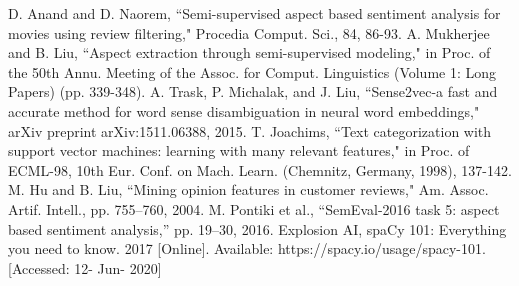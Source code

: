 \documentclass[a4paper,conference]{IEEEtran}
\begin{document}
\begin{thebibliography}{00}
 D. Anand and D. Naorem, ``Semi-supervised aspect based sentiment analysis for movies using review filtering," Procedia Comput. Sci., 84, 86-93.
 A. Mukherjee and B. Liu, ``Aspect extraction through semi-supervised modeling," in Proc. of the 50th Annu. Meeting of the Assoc. for Comput. Linguistics (Volume 1: Long Papers) (pp. 339-348).
 A. Trask, P. Michalak, and J. Liu, ``Sense2vec-a fast and accurate method for word sense disambiguation in neural word embeddings," arXiv preprint arXiv:1511.06388, 2015.
 T. Joachims, ``Text categorization with support vector machines: learning with many relevant features," in Proc. of ECML-98, 10th Eur. Conf. on Mach. Learn. (Chemnitz, Germany, 1998), 137-142.
 M. Hu and B. Liu, ``Mining opinion features in customer reviews," Am. Assoc. Artif. Intell., pp. 755–760, 2004.
 M. Pontiki et al., “SemEval-2016 task 5: aspect based sentiment analysis,” pp. 19–30, 2016.
 Explosion AI, spaCy 101: Everything you need to know. 2017 [Online]. Available: https://spacy.io/usage/spacy-101. [Accessed: 12- Jun- 2020] 
\end{thebibliography}
\vspace{12pt}
\end{document}
